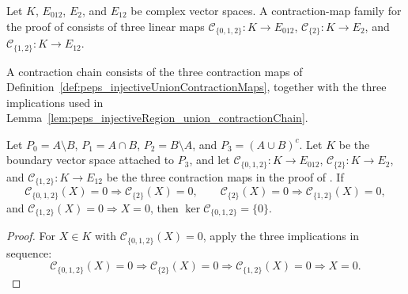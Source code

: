 \begin{definition}%
    \label{def:peps_injectiveUnionContractionMaps}
    \leanok
    Let $K$, $E_{012}$, $E_2$, and $E_{12}$ be complex vector spaces. A
    contraction-map family for the proof of
    \cite[Section~3]{Molnar2018NormalPEPS} consists of three linear maps
    $\mathcal C_{\{0,1,2\}}:K\to E_{012}$,
    $\mathcal C_{\{2\}}:K\to E_2$, and
    $\mathcal C_{\{1,2\}}:K\to E_{12}$.
\end{definition}

\begin{definition}%
    \label{def:peps_injectiveUnionContractionChain}
    \leanok
    A contraction chain consists of the three contraction maps of
    Definition~\ref{def:peps_injectiveUnionContractionMaps}, together with the
    three implications used in
    Lemma~\ref{lem:peps_injectiveRegion_union_contractionChain}.
\end{definition}

\begin{lemma}%
    \label{lem:peps_injectiveRegion_union_contractionChain}
    \leanok
    Let $P_0=A\setminus B$, $P_1=A\cap B$, $P_2=B\setminus A$, and
    $P_3=(A\cup B)^c$. Let $K$ be the boundary vector space attached to
    $P_3$, and let
    $\mathcal C_{\{0,1,2\}}:K\to E_{012}$,
    $\mathcal C_{\{2\}}:K\to E_2$, and
    $\mathcal C_{\{1,2\}}:K\to E_{12}$ be the three contraction maps in the
    proof of \cite[Section~3]{Molnar2018NormalPEPS}. If
    \[
        \mathcal C_{\{0,1,2\}}(X)=0
        \Longrightarrow \mathcal C_{\{2\}}(X)=0,\qquad
        \mathcal C_{\{2\}}(X)=0
        \Longrightarrow \mathcal C_{\{1,2\}}(X)=0,
    \]
    and
    $\mathcal C_{\{1,2\}}(X)=0\Longrightarrow X=0$, then
    $\ker \mathcal C_{\{0,1,2\}}=\{0\}$.
\end{lemma}
\begin{proof}\leanok
    For $X\in K$ with $\mathcal C_{\{0,1,2\}}(X)=0$, apply the three
    implications in sequence:
    \[
        \mathcal C_{\{0,1,2\}}(X)=0
        \Longrightarrow \mathcal C_{\{2\}}(X)=0
        \Longrightarrow \mathcal C_{\{1,2\}}(X)=0
        \Longrightarrow X=0.
    \]
\end{proof}

